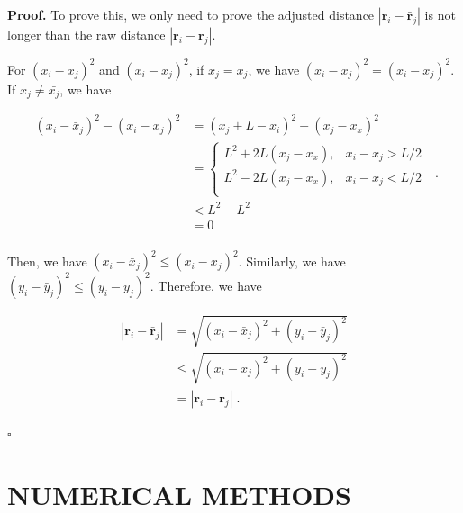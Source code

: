 \documentclass[%
 aip,
 amsmath,amssymb,
 reprint,%
]{revtex4-1}
\newenvironment{proof}{\noindent\textbf{Proof.}}{\hfill $\square$\par}
\begin{document}
\begin{proof}
    To prove this, we only need to prove the adjusted distance $\left| \mathbf{r}_i-\bar{\mathbf{r}}_j \right|$ is not longer than the raw distance $\left| \mathbf{r}_i-\mathbf{r}_j \right|$.
    
    For $\left( x_i-x_j \right) ^2$ and $\left( x_i-\bar{x_j} \right) ^2$, if $x_j=\bar{x_j}$, we have $\left( x_i-x_j \right) ^2=\left( x_i-\bar{x_j} \right) ^2$. If $x_j\ne \bar{x_j}$, we have

    \begin{equation}
        \begin{aligned}
            \left( x_i-\bar{x}_j \right) ^2-\left( x_i-x_j \right) ^2&=\left( x_j\pm L-x_i \right) ^2-\left( x_j-x_x \right) ^2\\
            &=\begin{cases}
            L^2+2L\left( x_j-x_x \right) ,&		x_i-x_j>L/2\\
            L^2-2L\left( x_j-x_x \right) ,&		x_i-x_j<L/2\\
        \end{cases}\\
            &<L^2-L^2\\
            &=0\\
        \end{aligned}\;.
    \end{equation}

    Then, we have $\left( x_i-\bar{x}_j \right) ^2\leqslant \left( x_i-x_j \right) ^2$. Similarly, we have $\left( y_i-\bar{y}_j \right) ^2\leqslant \left( y_i-y_j \right) ^2$. Therefore, we have 

    \begin{equation}
        \begin{aligned}
            \left| \mathbf{r}_i-\bar{\mathbf{r}}_j \right|&=\sqrt{\left( x_i-\bar{x}_j \right) ^2+\left( y_i-\bar{y}_j \right) ^2}\\
            &\leqslant \sqrt{\left( x_i-x_j \right) ^2+\left( y_i-y_j \right) ^2}\\
            &=\left| \mathbf{r}_i-\mathbf{r}_j \right|\;.
        \end{aligned}
    \end{equation}

\end{proof}


\section{\label{sec:numerics} NUMERICAL METHODS}
\end{document}
